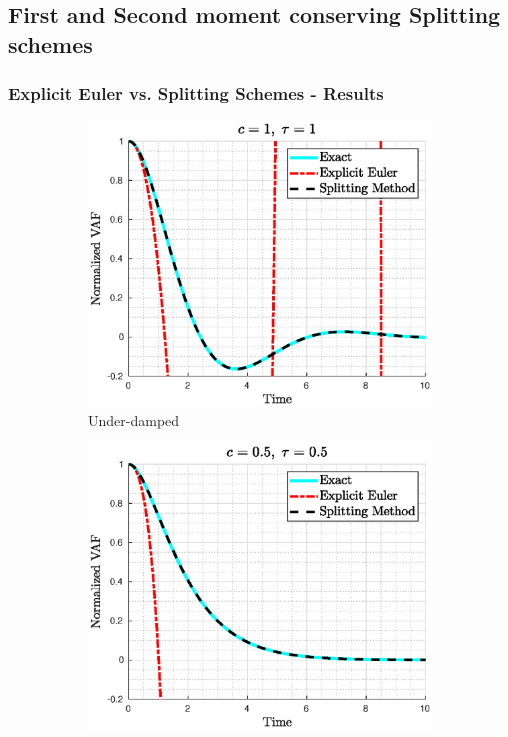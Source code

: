 \documentclass[a4paper,10pt]{beamer}
\begin{document}
	\begin{frame}
		\subsection{First and Second moment conserving Splitting schemes}
		\footnotesize
		\frametitle{Explicit Euler vs. Splitting Schemes - Results}
		\begin{figure}[H]
			\centering
			\begin{subfigure}[b]{0.326\linewidth}
				\includegraphics[width=\linewidth]{./Plots/CaseStudy/nonnorm_scale_under.eps}
				\caption{Under-damped}
			\end{subfigure}
			\begin{subfigure}[b]{0.326\linewidth}
				\includegraphics[width=\linewidth]{./Plots/CaseStudy/nonnorm_scale_critical.eps}

\end{subfigure}
\end{figure}
\end{frame}
\end{document}

